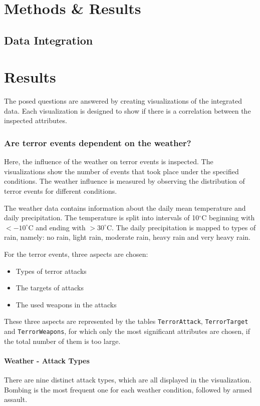 \section{Methods \& Results}
\subsection{Data Integration}

\section{Results}
The posed questions are answered by creating visualizations of the integrated data. Each visualization is designed to show if there is a correlation between the inspected attributes.

\subsubsection{Are terror events dependent on the weather?}
Here, the influence of the weather on terror events is inspected. The visualizations show the number of events that took place under the specified conditions. The weather influence is measured by observing the distribution of terror events for different conditions.

The weather data contains information about the daily mean temperature and daily precipitation. The temperature is split into intervals of 10$^\circ$C beginning with $< -10^\circ$C and ending with $> 30^\circ$C. The daily precipitation is mapped to types of rain, namely: no rain, light rain, moderate rain, heavy rain and very heavy rain.

For the terror events, three aspects are chosen:
\begin{itemize}
	\item Types of terror attacks
	\item The targets of attacks
	\item The used weapons in the attacks
\end{itemize}

These three aspects are represented by the tables \texttt{TerrorAttack}, \texttt{TerrorTarget} and \texttt{TerrorWeapons}, for which only the most significant attributes are chosen, if the total number of them is too large.

\paragraph{Weather - Attack Types}
There are nine distinct attack types, which are all displayed in the visualization. Bombing is the most frequent one for each weather condition, followed by armed assault.

